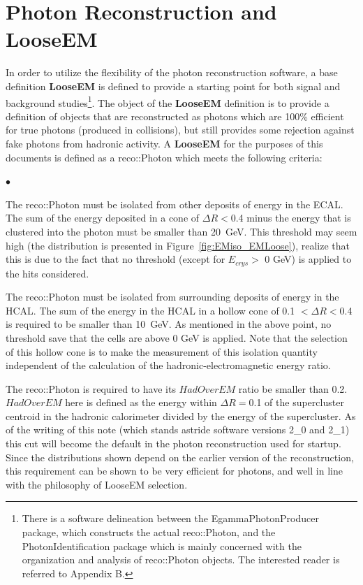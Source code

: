 \documentclass{cmspaper}
\begin{document}
\section{Photon Reconstruction and LooseEM}
In order to utilize the flexibility of the photon reconstruction software, a base definition {\bf LooseEM} is defined to provide a starting point for both signal and background studies\footnote{There is a software delineation between the EgammaPhotonProducer package, which constructs the actual reco::Photon, and the PhotonIdentification package which is mainly concerned with the organization and analysis of reco::Photon objects.  The interested reader is referred to Appendix B.}.  The object of the {\bf LooseEM} definition is to provide a definition of objects that are reconstructed as photons which are 100\% efficient for true photons (produced in collisions), but still provides some rejection against fake photons from hadronic activity.  A {\bf LooseEM} for the purposes of this documents is defined as a reco::Photon which meets the following criteria:
\begin{list}{$\bullet$}
 \item{The reco::Photon must be isolated from other deposits of energy in the ECAL.  The sum of the energy deposited in a cone
of $\Delta R <$0.4 minus the energy that is clustered into the photon must be smaller than 20~GeV.  This threshold may seem high (the distribution is presented in Figure~\ref{fig:EMiso_EMLoose}), realize that this is due to the fact that no threshold (except for $E_{crys} >$ 0 GeV) is applied to the hits considered.}
 \item{The reco::Photon must be isolated from surrounding deposits of energy in the HCAL.  The sum of the energy in the HCAL in
a hollow cone of 0.1 $< \Delta R<$0.4 is required to be smaller than 10~GeV.  As mentioned in the above point, no threshold save that the cells are above 0 GeV is applied.  Note that the selection of this hollow cone is to make the measurement of this isolation quantity independent of the calculation of the hadronic-electromagnetic energy ratio.}
 \item{The reco::Photon is required to have its $HadOverEM$ ratio be smaller than 0.2.  $HadOverEM$ here is defined as the energy within $\Delta R=$0.1 of the supercluster centroid in the hadronic calorimeter divided by the energy of the supercluster.  As of the writing of this note (which stands astride software versions 2\_0 and 2\_1) this cut will become the default in the photon reconstruction used for startup.  Since the distributions shown depend on the earlier version of the reconstruction, this requirement can be shown to be very efficient for photons, and well in line with the philosophy of LooseEM selection.}
\end{list}
\end{document}
